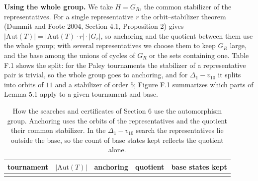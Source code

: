 \documentclass[
]{article}
\begin{document}
\textbf{Using the whole group.} We take \(H = G_R\), the common
stabilizer of the representatives. For a single representative \(r\) the
orbit--stabilizer theorem (Dummit and Foote 2004, Section 4.1,
Proposition 2) gives
\(|\mathrm{Aut}(T)| = |\mathrm{Aut}(T) \cdot r| \cdot |G_r|\), so
anchoring and the quotient between them use the whole group; with
several representatives we choose them to keep \(G_R\) large, and the
base among the unions of cycles of \(G_R\) or the sets containing one.
Table F.1 shows the split: for the Paley tournaments the stabilizer of a
representative pair is trivial, so the whole group goes to anchoring,
and for \(\Delta_1 - v_{10}\) it splits into orbits of \(11\) and a
stabilizer of order \(5\); Figure F.1 summarizes which parts of Lemma
5.1 apply to a given tournament and base.

\begin{table}[!htbp]
\centering
\caption{How the searches and certificates of Section 6 use the
automorphism group. Anchoring uses the orbits of the representatives and
the quotient their common stabilizer. In the \(\Delta_1 - v_{10}\)
search the representatives lie outside the base, so the count of base
states kept reflects the quotient alone.}
\begin{tabular}{@{}
  >{\raggedright\arraybackslash}p{}
  >{\raggedleft\arraybackslash}p{}
  >{\raggedright\arraybackslash}p{}
  >{\raggedright\arraybackslash}p{}
  >{\raggedleft\arraybackslash}p{}@{}}
\toprule\noalign{}
\begin{minipage}[b]{\linewidth}\raggedright
tournament
\end{minipage} & \begin{minipage}[b]{\linewidth}\raggedleft
\(\lvert \mathrm{Aut}(T) \rvert\)
\end{minipage} & \begin{minipage}[b]{\linewidth}\raggedright
anchoring
\end{minipage} & \begin{minipage}[b]{\linewidth}\raggedright
quotient
\end{minipage} & \begin{minipage}[b]{\linewidth}\raggedleft
base states kept
\end{minipage} \\
\midrule\noalign{}


\end{tabular}
\end{table}
\end{document}

